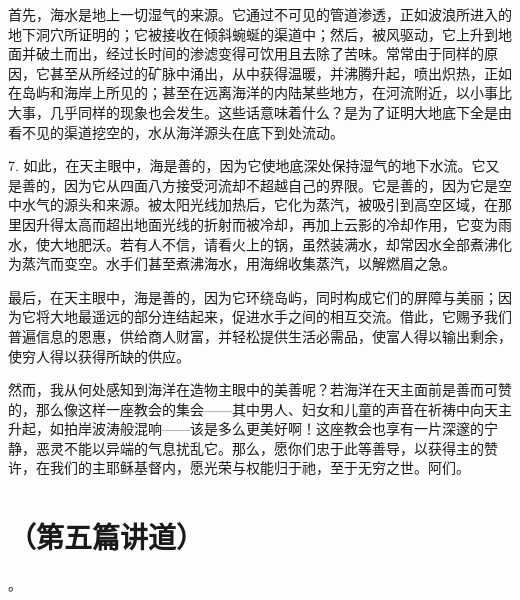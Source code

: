 首先，海水是地上一切湿气的来源。它通过不可见的管道渗透，正如波浪所进入的地下洞穴所证明的；它被接收在倾斜蜿蜒的渠道中；然后，被风驱动，它上升到地面并破土而出，经过长时间的渗滤变得可饮用且去除了苦味。常常由于同样的原因，它甚至从所经过的矿脉中涌出，从中获得温暖，并沸腾升起，喷出炽热，正如在岛屿和海岸上所见的；甚至在远离海洋的内陆某些地方，在河流附近，以小事比大事，几乎同样的现象也会发生。这些话意味着什么？是为了证明大地底下全是由看不见的渠道挖空的，水从海洋源头在底下到处流动。\par

7. 如此，在天主眼中，海是善的，因为它使地底深处保持湿气的地下水流。它又是善的，因为它从四面八方接受河流却不超越自己的界限。它是善的，因为它是空中水气的源头和来源。被太阳光线加热后，它化为蒸汽，被吸引到高空区域，在那里因升得太高而超出地面光线的折射而被冷却，再加上云影的冷却作用，它变为雨水，使大地肥沃。若有人不信，请看火上的锅，虽然装满水，却常因水全部煮沸化为蒸汽而变空。水手们甚至煮沸海水，用海绵收集蒸汽，以解燃眉之急。\par

最后，在天主眼中，海是善的，因为它环绕岛屿，同时构成它们的屏障与美丽；因为它将大地最遥远的部分连结起来，促进水手之间的相互交流。借此，它赐予我们普遍信息的恩惠，供给商人财富，并轻松提供生活必需品，使富人得以输出剩余，使穷人得以获得所缺的供应。\par

然而，我从何处感知到海洋在造物主眼中的美善呢？若海洋在天主面前是善而可赞的，那么像这样一座教会的集会——其中男人、妇女和儿童的声音在祈祷中向天主升起，如拍岸波涛般混响——该是多么更美好啊！这座教会也享有一片深邃的宁静，恶灵不能以异端的气息扰乱它。那么，愿你们忠于此等善导，以获得主的赞许，在我们的主耶稣基督内，愿光荣与权能归于祂，至于无穷之世。阿们。\par



\section{（第五篇讲道）}

。\par

